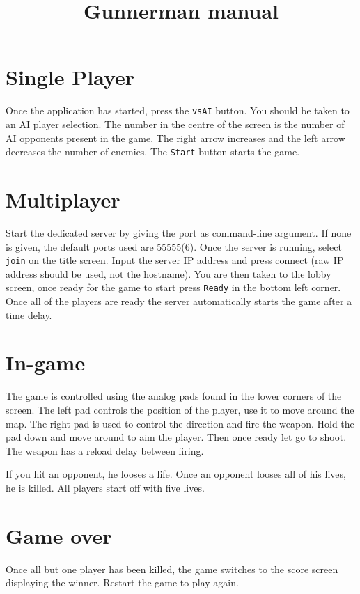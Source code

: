 \documentclass[11pt]{article} %
\title{Gunnerman manual}
\date{} %
\begin{document}
\maketitle

\section*{Single Player}

Once the application has started, press the \verb+vsAI+ button. You should be taken to an AI player selection. The number in the centre of the screen is the number of AI opponents present in the game. The right arrow increases and the left arrow decreases the number of enemies. The \verb+Start+ button starts the game.

\section*{Multiplayer}

Start the dedicated server by giving the port as command-line argument. If none is given, the default ports used are 55555(6). Once the server is running, select \verb+join+ on the title screen. Input the server IP address and press connect (raw IP address should be used, not the hostname). You are then taken to the lobby screen, once ready for the game to start press \verb+Ready+ in the bottom left corner. Once all of the players are ready the server automatically starts the game after a time delay.

\section*{In-game}

The game is controlled using the analog pads found in the lower corners of the screen. The left pad controls the position of the player, use it to move around the map. The right pad is used to control the direction and fire the weapon. Hold the pad down and move around to aim the player. Then once ready let go to shoot. The weapon has a reload delay between firing.

If you hit an opponent, he looses a life. Once an opponent looses all of his lives, he is killed. All players start off with five lives.

\section*{Game over}

Once all but one player has been killed, the game switches to the score screen displaying the winner. Restart the game to play again.
\end{document}
